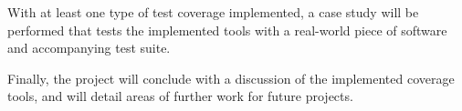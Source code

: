 With at least one type of test coverage implemented, a case study will be performed that tests the implemented tools with a real-world piece of software and accompanying test suite. 

Finally, the project will conclude with a discussion of the implemented coverage tools, and will detail areas of further work for future projects.